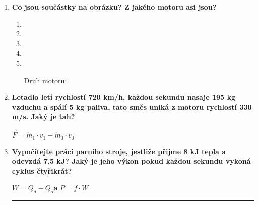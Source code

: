 \documentclass[../main.tex]{subfiles}
\begin{document}
\begin{enumerate}[label={\textbf{\arabic*.}}, resume]

    \item \textbf{Co jsou součástky na obrázku? Z jakého motoru asi jsou?}
        \begin{enumerate}[label={\arabic*.}, wide=0pt]
            \item \tecky{5.3cm}
            \item \tecky{5.3cm}
            \item \tecky{5.3cm}
            \item \tecky{5.3cm}
            \item \tecky{5.3cm}
            \item[Druh motoru:]\tecky{3cm}
        \end{enumerate}

    \item \textbf{Letadlo letí rychlostí 720 km/h, každou sekundu nasaje 195 kg vzduchu a spálí 5 kg paliva, tato směs uniká z motoru rychlostí 330 m/s. Jaký je tah?}
    \vspace{-0.75cm}
    \begin{flushright}
        \begin{minipage}{0.25\textwidth}
            \begin{tcolorbox}[colframe=black, colback=white, boxrule=0.6pt]
                {\(\vec{F}=\dot{m}_{1}\cdot{v_1}-\dot{m}_{0}\cdot{v_0}\)}
            \end{tcolorbox}
        \end{minipage}
    \end{flushright}
    \vspace{6cm}

    \item \textbf{Vypočítejte práci parního stroje, jestliže přijme 8 kJ tepla a odevzdá 7,5 kJ? Jaký je jeho výkon pokud každou sekundu vykoná cyklus čtyřikrát?}
    \vspace{-0.75cm}
    \begin{flushright}
        \begin{minipage}{0.32\textwidth}
            \begin{tcolorbox}[colframe=black, colback=white, boxrule=0.6pt]
                {\(W=Q_d-Q_o\)\hspace{0.25cm}\textbf{a}\hspace{0.25cm}  \(P=f\cdot{W}\)}
            \end{tcolorbox}
        \end{minipage}
    \end{flushright}
    \vspace{6cm}
    \hrule
\end{enumerate}
\end{document}
